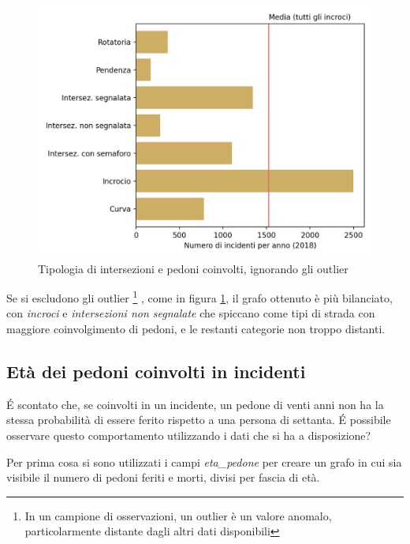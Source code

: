 \documentclass[a4paper]{report}
\begin{document}
\begin{figure}
    \includegraphics[width=\linewidth]{../src/incidenti/incidenti_senza_coords/pedoni/pedoni_no_rett.png}
    \caption{Tipologia di intersezioni e pedoni coinvolti, ignorando gli outlier}
    \label{fig:pedoni-no-rett}
\end{figure}

Se si escludono gli outlier
\footnote{In un campione di osservazioni, un outlier è un valore anomalo, 
particolarmente distante dagli altri dati disponibili}
, 
come in figura \ref{fig:pedoni-no-rett}, il grafo ottenuto è più bilanciato, 
con \textit{incroci} e \textit{intersezioni non segnalate} che spiccano come tipi di strada con 
maggiore coinvolgimento di pedoni, e le restanti categorie non troppo distanti.


\subsection{Età dei pedoni coinvolti in incidenti}

\'E scontato che, se coinvolti in un incidente, un pedone di venti anni non ha la stessa 
probabilità di essere ferito rispetto a una persona di settanta.
\'E possibile osservare questo comportamento utilizzando i dati che si ha a disposizione?

Per prima cosa si sono utilizzati i campi \textit{eta\_pedone} per creare un grafo in cui sia 
visibile il numero di pedoni feriti e morti, divisi per fascia di età.
\end{document}
